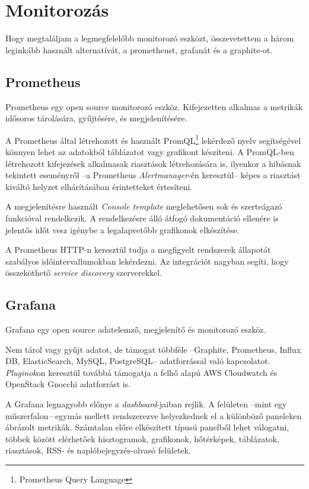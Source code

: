 \section{Monitorozás}\label{sec:metrikak_tervezes}
Hogy megtaláljam a legmegfelelőbb monitorozó eszközt, összevetettem a három leginkább használt alternatívát, a prometheust, grafanát és a graphite-ot.

\subsection{Prometheus}
Prometheus egy open source monitorozó eszköz. Kifejezetten alkalmas a metrikák idősoros tárolására, gyűjtésére, és megjelenítésére.

A Prometheus által létrehozott és használt PromQL\footnote{Prometheus Query Language} lekérdező nyelv segítségével könnyen lehet az adatokból táblázatot vagy grafikont készíteni. A PromQL-ben létrehozott kifejezések alkalmasak riasztások létrehozására is, ilyenkor a hibásnak tekintett eseményről --a Prometheus \textit{Alertmanager}-én keresztül-- képes a riasztást kiváltó helyzet elhárításában érintetteket értesíteni.

A megjelenítésre használt \textit{Console template} meglehetősen sok és szerteágazó funkcióval rendelkezik. A rendelkezésre álló átfogó dokumentáció ellenére is jelentős időt vesz igénybe a legalapvetőbb grafikonok elkészítése.

A Prometheus HTTP-n keresztül tudja a megfigyelt rendszerek állapotát szabályos időintervallumokban lekérdezni. Az integrációt nagyban segíti, hogy összeköthető \textit{service discovery} szerverekkel.

\subsection{Grafana}
Grafana egy open source adatelemző, megjelenítő és monitorozó eszköz.

Nem tárol vagy gyűjt adatot, de támogat többféle --Graphite, Prometheus, Influx DB, ElasticSearch, MySQL, PostgreSQL-- adatforrással való kapcsolatot. \textit{Pluginok}on keresztül továbbá támogatja a felhő alapú AWS Cloudwatch és OpenStack Gnocchi adatforrást is.


A Grafana legnagyobb előnye a \textit{dashboard}-jaiban rejlik. A felületen --mint egy műszerfalon-- egymás mellett rendszerezve helyezkednek el a különböző paneleken ábrázolt metrikák. Számtalan előre elkészített típusú panelből lehet válogatni, többek között elérhetőek hisztogramok, grafikonok, hőtérképek, táblázatok, riasztások, RSS- és naplóbejegyzés-olvasó felületek.

